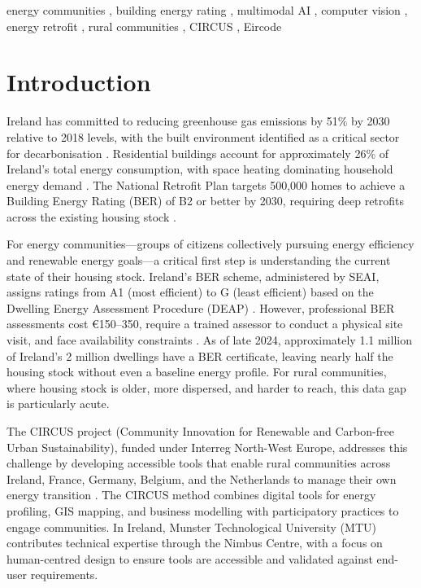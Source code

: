 \documentclass[preprint,12pt,authoryear]{elsarticle}
\begin{document}
\begin{frontmatter}
\begin{keyword}
  energy communities \sep
  building energy rating \sep
  multimodal AI \sep
  computer vision \sep
  energy retrofit \sep
  rural communities \sep
  CIRCUS \sep
  Eircode
\end{keyword}

\end{frontmatter}

\section{Introduction}
\label{sec:introduction}

Ireland has committed to reducing greenhouse gas emissions by 51\% by 2030 relative to 2018 levels, with the built environment identified as a critical sector for decarbonisation \citep{cap_2024}. Residential buildings account for approximately 26\% of Ireland's total energy consumption, with space heating dominating household energy demand \citep{seai_conversion_factors}. The National Retrofit Plan targets 500,000 homes to achieve a Building Energy Rating (BER) of B2 or better by 2030, requiring deep retrofits across the existing housing stock \citep{national_retrofit_plan}.

For energy communities---groups of citizens collectively pursuing energy efficiency and renewable energy goals---a critical first step is understanding the current state of their housing stock. Ireland's BER scheme, administered by SEAI, assigns ratings from A1 (most efficient) to G (least efficient) based on the Dwelling Energy Assessment Procedure (DEAP) \citep{seai_ber_scheme, seai_deap_manual}. However, professional BER assessments cost \euro{}150--350, require a trained assessor to conduct a physical site visit, and face availability constraints \citep{cso_ber_2024}. As of late 2024, approximately 1.1 million of Ireland's 2 million dwellings have a BER certificate, leaving nearly half the housing stock without even a baseline energy profile. For rural communities, where housing stock is older, more dispersed, and harder to reach, this data gap is particularly acute.

The CIRCUS project (Community Innovation for Renewable and Carbon-free Urban Sustainability), funded under Interreg North-West Europe, addresses this challenge by developing accessible tools that enable rural communities across Ireland, France, Germany, Belgium, and the Netherlands to manage their own energy transition \citep{circus_project}. The CIRCUS method combines digital tools for energy profiling, GIS mapping, and business modelling with participatory practices to engage communities. In Ireland, Munster Technological University (MTU) contributes technical expertise through the Nimbus Centre, with a focus on human-centred design to ensure tools are accessible and validated against end-user requirements.
\end{document}
